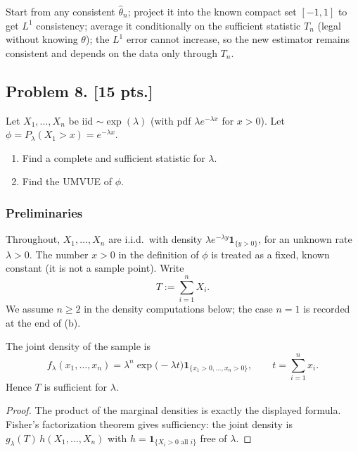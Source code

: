 \documentclass[11pt,a4paper]{article}
\begin{document}
\begin{remark*}
Start from any consistent \(\hat\theta_n\); project it into the known compact set \([-1,1]\) to get \(L^1\) consistency; average it conditionally on the sufficient statistic \(T_n\) (legal without knowing \(\theta\)); the \(L^1\) error cannot increase, so the new estimator remains consistent and depends on the data only through \(T_n\).
\end{remark*}

\subsection{Problem 8. [15 pts.]}
Let \( X_1, \dots, X_n \) be iid \( \sim \exp(\lambda) \) (with pdf \( \lambda e^{-\lambda x} \) for \( x > 0 \)). Let \( \phi = P_\lambda(X_1 > x) = e^{-\lambda x} \).
\begin{enumerate}[label=(\alph*)]
    \item Find a complete and sufficient statistic for \( \lambda \).
    \item Find the UMVUE of \( \phi \).
\end{enumerate}

\setcounter{section}{8}
\setcounter{theorem}{0}
\setcounter{definition}{0}
\setcounter{remark}{0}
\setcounter{note}{0}

\subsubsection{Preliminaries}

Throughout, \(X_1,\dots,X_n\) are i.i.d.\ with density \(\lambda e^{-\lambda y}\mathbf{1}_{\{y>0\}}\), for an unknown rate \(\lambda>0\). The number \(x>0\) in the definition of \(\phi\) is treated as a fixed, known constant (it is not a sample point). Write
\[
T
:=
\sum_{i=1}^n X_i.
\]
We assume \(n\ge 2\) in the density computations below; the case \(n=1\) is recorded at the end of (b).

\begin{lemma}
\label{lem:p8-suff}
The joint density of the sample is
\[
f_\lambda(x_1,\dots,x_n)
=
\lambda^n\exp\bigl(-\lambda t\bigr)
\mathbf{1}_{\{x_1>0,\dots,x_n>0\}},
\qquad
t=\sum_{i=1}^n x_i.
\]
Hence \(T\) is sufficient for \(\lambda\).
\end{lemma}

\begin{proof}
The product of the marginal densities is exactly the displayed formula. Fisher's factorization theorem gives sufficiency: the joint density is \(g_\lambda(T)\,h(X_1,\dots,X_n)\) with \(h=\mathbf{1}_{\{X_i>0\text{ all }i\}}\) free of \(\lambda\).
\end{proof}
\end{document}
